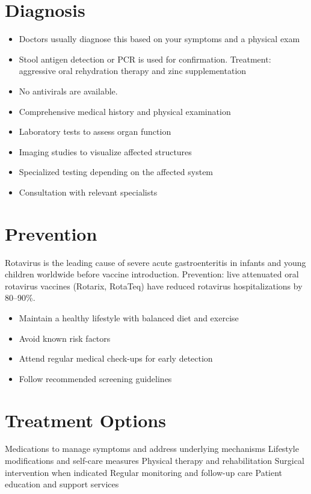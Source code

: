 \section{Diagnosis}
\begin{itemize}[noitemsep]
  \item Doctors usually diagnose this based on your symptoms and a physical exam
  \item Stool antigen detection or PCR is used for confirmation. Treatment: aggressive oral rehydration therapy and zinc supplementation
  \item No antivirals are available.
  \item Comprehensive medical history and physical examination
  \item Laboratory tests to assess organ function
  \item Imaging studies to visualize affected structures
  \item Specialized testing depending on the affected system
  \item Consultation with relevant specialists
\end{itemize}
\section{Prevention}
Rotavirus is the leading cause of severe acute gastroenteritis in infants and young children worldwide before vaccine introduction. Prevention: live attenuated oral rotavirus vaccines (Rotarix, RotaTeq) have reduced rotavirus hospitalizations by 80--90\%.

\begin{itemize}[noitemsep]
  \item Maintain a healthy lifestyle with balanced diet and exercise
  \item Avoid known risk factors
  \item Attend regular medical check-ups for early detection
  \item Follow recommended screening guidelines
\end{itemize}
\section{Treatment Options}
Medications to manage symptoms and address underlying mechanisms Lifestyle modifications and self-care measures Physical therapy and rehabilitation Surgical intervention when indicated Regular monitoring and follow-up care Patient education and support services

